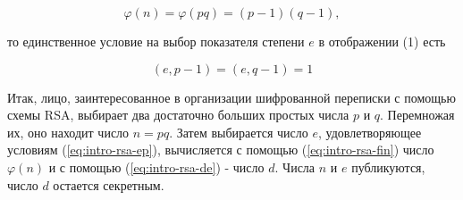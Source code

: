 \begin{equation} \label{eq:intro-rsa-fin}
 \varphi(n) = \varphi(p q) = (p-1)(q-1),
\end{equation}

то единственное условие на выбор показателя степени $e$ в отображении (1) есть

\begin{equation} \label{eq:intro-rsa-ep}
 (e, p - 1) = (e, q - 1) = 1
\end{equation}

  Итак, лицо, заинтересованное в организации шифрованной переписки с помощью схемы RSA, выбирает два достаточно больших простых числа $p$ и $q$. 
Перемножая их, оно находит число $n = p q$. Затем выбирается число $e$, удовлетворяющее условиям (\ref{eq:intro-rsa-ep}), вычисляется с помощью (\ref{eq:intro-rsa-fin}) 
число $\varphi(n)$ и с помощью (\ref{eq:intro-rsa-de}) - число $d$. Числа $n$ и $e$ публикуются, число $d$ остается секретным.

